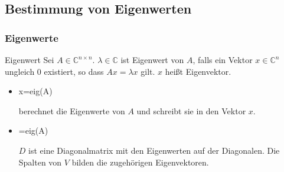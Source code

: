 \documentclass[hyperref={xetex}]{beamer}
\begin{document}
\subsection{Bestimmung von Eigenwerten}
% 
%
\begin{frame}[fragile]\frametitle{Eigenwerte}
\begin{block}{Eigenwert}
Sei $A \in \mathbb{C}^{n \times n}$. $\lambda \in \mathbb{C}$ ist
Eigenwert von $A$, falls ein Vektor $x \in \mathbb{C}^n$ ungleich $0$ existiert, so
dass  $Ax = \lambda x$ gilt. $x$ heißt Eigenvektor.  
\end{block}

\begin{itemize}
\item 
  \begin{matlabin}
x=eig(A)
  \end{matlabin}
  berechnet die Eigenwerte von $A$ und schreibt
  sie in den Vektor $x$.
\item
  \begin{matlabin}
[V,D]=eig(A)
  \end{matlabin}
  $D$ ist eine Diagonalmatrix mit den Eigenwerten auf der
  Diagonalen. Die Spalten von $V$ bilden die zugehörigen Eigenvektoren. 
\end{itemize}
\end{frame}
% 
%
\end{document}
